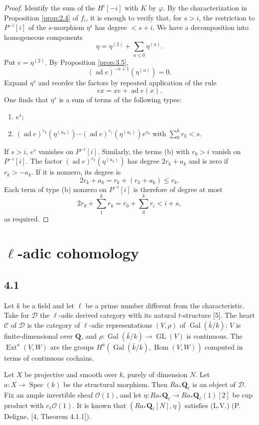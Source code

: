 \documentclass[11pt,a4paper]{article}
\theoremstyle{plain}
\theoremstyle{definition}
\theoremstyle{remark}
\DeclareMathOperator{\Ext}{Ext}
\DeclareMathOperator{\Hom}{Hom}
\DeclareMathOperator{\Gal}{Gal}
\DeclareMathOperator{\Spec}{Spec}
\DeclareMathOperator{\GL}{GL}
\newcommand{\cD}{\mathscr{D}}
\newcommand{\cC}{\mathscr{C}}
\newcommand{\bQ}{\mathbf{Q}}
\begin{document}
\begin{proof}
Identify the sum of the $H^i[-i]$ with $K$ by $\varphi$. By the characterization in Proposition \ref{prop:2.4} of $f_i$, it is enough to verify that, for $s>i$, the restriction to $P^{-i}[i]$ of the $s$-morphism $\eta^s$ has degree $<s+i$. We have a decomposition into homogeneous components
\[
\eta=\eta^{(2)}+\sum_{a\leqslant0}\eta^{(a)}.
\]
Put $e=\eta^{(2)}$. By Proposition \ref{prop:3.5},
\[
(\operatorname{ad}e)^{-a+1}(\eta^{(a)})=0.
\]
Expand $\eta^s$ and reorder the factors by repeated application of the rule
\[
ex=xe+\operatorname{ad}e(x).
\]
One finds that $\eta^s$ is a sum of terms of the following types:
\begin{enumerate}[label=(\alph*)]
\item $e^s$;
\item $(\operatorname{ad}e)^{r_k}(\eta^{(a_k)})\cdots(\operatorname{ad}e)^{r_1}(\eta^{(a_1)})e^{r_0}$ with $\sum_0^k r_k<s$.
\end{enumerate}
If $s>i$, $e^s$ vanishes on $P^{-i}[i]$. Similarly, the terms (b) with $r_0>i$ vanish on $P^{-i}[i]$. The factor $(\operatorname{ad}e)^{r_k}(\eta^{(a_k)})$ has degree $2r_k+a_k$ and is zero if $r_k>-a_k$. If it is nonzero, its degree is
\[
2r_k+a_k=r_k+(r_k+a_k)\leqslant r_k.
\]
Each term of type (b) nonzero on $P^{-i}[i]$ is therefore of degree at most
\[
2r_0+\sum_1^k r_k=r_0+\sum_0^k r_i<i+s,
\]
as required.
\end{proof}

\section{\texorpdfstring{$\ell$}{ell}-adic cohomology}

\subsection*{4.1}
Let $k$ be a field and let $\ell$ be a prime number different from the characteristic. Take for $\cD$ the $\ell$-adic derived category with its natural $t$-structure [5]. The heart $\cC$ of $\cD$ is the category of $\ell$-adic representations $(V,\rho)$ of $\Gal(\bar k/k)$: $V$ is finite-dimensional over $\bQ$, and $\rho\colon\Gal(\bar k/k)\to\GL(V)$ is continuous. The $\Ext^a(V,W)$ are the groups $H^a(\Gal(\bar k/k),\Hom(V,W))$ computed in terms of continuous cochains.

Let $X$ be projective and smooth over $k$, purely of dimension $N$. Let $a\colon X\to\Spec(k)$ be the structural morphism. Then $Ra_*\bQ_\ell$ is an object of $\cD$. Fix an ample invertible sheaf $\mathcal{O}(1)$, and let $\eta\colon Ra_*\bQ_\ell\to Ra_*\bQ_\ell(1)[2]$ be cup product with $c_1\mathcal{O}(1)$. It is known that $(Ra_*\bQ_\ell[N],\eta)$ satisfies (L.V.) (P. Deligne, [4, Theorem 4.1.1]).
\end{document}

